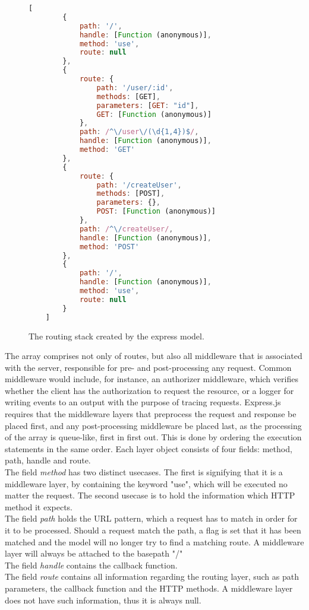 \begin{figure}[ht]
	\begin{lstlisting}[language=JavaScript, gobble=4]
    [
        {
            path: '/',
            handle: [Function (anonymous)],
            method: 'use',
            route: null
        },
        {
            route: {
                path: '/user/:id',
                methods: [GET],
                parameters: [GET: "id"],
                GET: [Function (anonymous)]
            },
            path: /^\/user\/(\d{1,4})$/,
            handle: [Function (anonymous)],
            method: 'GET'
        },
        {
            route: {
                path: '/createUser',
                methods: [POST],
                parameters: {},
                POST: [Function (anonymous)]
            },
            path: /^\/createUser/,
            handle: [Function (anonymous)],
            method: 'POST'
        },
        {
            path: '/',
            handle: [Function (anonymous)],
            method: 'use',
            route: null
        }
    ]
	\end{lstlisting}
	\caption{The routing stack created by the express model.}
	\label{fig:stack-example}
\end{figure}
The array comprises not only of routes, but also all middleware that is associated with the server, responsible for pre- and post-processing any request. Common middleware would include, for instance, an authorizer middleware, which verifies whether the client has the authorization to request the resource, or a logger for writing events to an output with the purpose of tracing requests.
Express.js requires that the middleware layers that preprocess the request and response be placed first, and any post-processing middleware be placed last, as the processing of the array is queue-like, first in first out. This is done by ordering the execution statements in the same order.
Each layer object consists of four fields: method, path, handle and route.\\
The field \textit{method} has two distinct usecases. The first is signifying that it is a middleware layer, by containing the keyword "use", which will be executed no matter the request.
The second usecase is to hold the information which HTTP method it expects. \\
The field \textit{path} holds the URL pattern, which a request has to match in order for it to be processed. Should a request match the path, a flag is set that it has been matched and the model will no longer try to find a matching route. A middleware layer will always be attached to the basepath "/"\\
The field \textit{handle} contains the callback function.\\
The field \textit{route} contains all information regarding the routing layer, such as path parameters, the callback function and the HTTP methods. A middleware layer does not have such information, thus it is always null.
